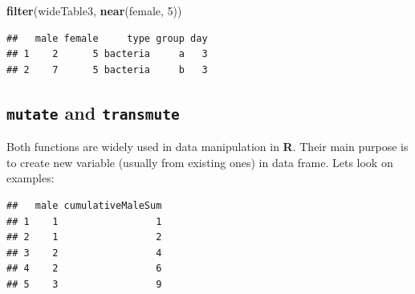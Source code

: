 \documentclass[]{book}
\newenvironment{Shaded}{\begin{snugshade}}{\end{snugshade}}
\newcommand{\KeywordTok}[1]{\textcolor[rgb]{0.13,0.29,0.53}{\textbf{#1}}}
\newcommand{\DataTypeTok}[1]{\textcolor[rgb]{0.13,0.29,0.53}{#1}}
\newcommand{\DecValTok}[1]{\textcolor[rgb]{0.00,0.00,0.81}{#1}}
\newcommand{\StringTok}[1]{\textcolor[rgb]{0.31,0.60,0.02}{#1}}
\newcommand{\OperatorTok}[1]{\textcolor[rgb]{0.81,0.36,0.00}{\textbf{#1}}}
\newcommand{\NormalTok}[1]{#1}
\theoremstyle{definition}
\theoremstyle{definition}
\theoremstyle{definition}
\theoremstyle{remark}
\begin{document}
\begin{Shaded}
\begin{Highlighting}[]
\KeywordTok{filter}\NormalTok{(wideTable3, }\KeywordTok{near}\NormalTok{(female, }\DecValTok{5}\NormalTok{))}
\end{Highlighting}
\end{Shaded}

\begin{verbatim}
##   male female     type group day
## 1    2      5 bacteria     a   3
## 2    7      5 bacteria     b   3
\end{verbatim}

\subsection{\texorpdfstring{\texttt{mutate} and
\texttt{transmute}}{mutate and transmute}}\label{mutate-and-transmute}

Both functions are widely used in data manipulation in \textbf{R}. Their
main purpose is to create new variable (usually from existing ones) in
data frame. Lets look on examples:

\begin{Shaded}
\end{Shaded}

\begin{verbatim}
##   male cumulativeMaleSum
## 1    1                 1
## 2    1                 2
## 3    2                 4
## 4    2                 6
## 5    3                 9
\end{verbatim}

\begin{Shaded}
\end{Shaded}
\end{document}
